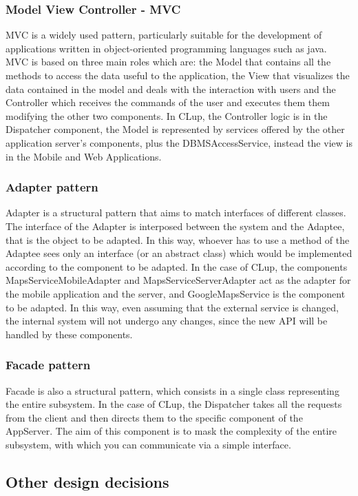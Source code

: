 \subsubsection{Model View Controller - MVC}
MVC is a widely used pattern, particularly suitable for the development of applications written in object-oriented programming languages such as java. MVC is based on three main roles which are: the Model that contains all the methods to access the data useful to the application, the View that visualizes the data contained in the model and deals with the interaction with users and the Controller which receives the commands of the user and executes them them modifying the other two components. In CLup, the Controller logic is in the Dispatcher component, the Model is represented by services offered by the other application server's components, plus the DBMSAccessService, instead the view is in the Mobile and Web Applications.\\
\subsubsection{Adapter pattern}
Adapter is a structural pattern that aims to match interfaces of different classes. The interface of the Adapter is interposed between the system and the Adaptee, that is the object to be adapted. In this way, whoever has to use a method of the Adaptee sees only an interface (or an abstract class) which would be implemented according to the component to be adapted. In the case of CLup, the components MapsServiceMobileAdapter and MapsServiceServerAdapter act as the adapter for the mobile application and the server, and GoogleMapsService is the component to be adapted. In this way, even assuming that the external service is changed, the internal system will not undergo any changes, since the new API will be handled by these components.\\
\subsubsection{Facade pattern}
Facade is also a structural pattern, which consists in a single class representing the entire subsystem. In the case of CLup, the Dispatcher takes all the requests from the client and then directs them to the specific component of the AppServer. The aim of this component is to mask the complexity of the entire subsystem, with which you can communicate via a simple interface.
\newpage
\subsection {Other design decisions}
